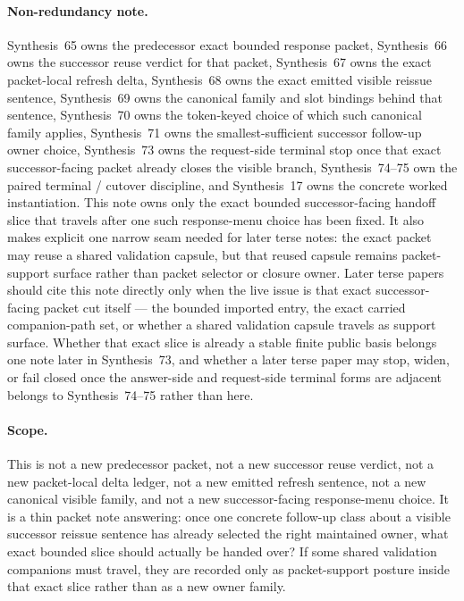 \documentclass[11pt]{article}
\begin{document}
\paragraph{Non-redundancy note.}
Synthesis~65 owns the predecessor exact bounded response packet, Synthesis~66 owns the successor reuse verdict for that packet, Synthesis~67 owns the exact packet-local refresh delta, Synthesis~68 owns the exact emitted visible reissue sentence, Synthesis~69 owns the canonical family and slot bindings behind that sentence, Synthesis~70 owns the token-keyed choice of which such canonical family applies, Synthesis~71 owns the smallest-sufficient successor follow-up owner choice, Synthesis~73 owns the request-side terminal stop once that exact successor-facing packet already closes the visible branch, Synthesis~74--75 own the paired terminal / cutover discipline, and Synthesis~17 owns the concrete worked instantiation.\cite{series:publicrequestresponsepackets,series:publicrequestresponsepacketcarryforward,series:publicrequestresponsepacketdeltas,series:publicrequestresponsepacketrefreshnotices,series:publicrequestresponsepacketrefreshnoticenormalforms,series:publicrequestresponsepacketrefreshnoticeselections,series:publicrequestresponsepacketrefreshresponsemenus,series:publicrequestresponsepacketrefreshresponsepacketclosureverdicts,series:pairedterminalcitationdiscipline,series:pairedterminalcutoverrules,series:workedexample}
This note owns only the exact bounded successor-facing handoff slice that travels after one such response-menu choice has been fixed. It also makes explicit one narrow seam needed for later terse notes: the exact packet may reuse a shared validation capsule, but that reused capsule remains packet-support surface rather than packet selector or closure owner. Later terse papers should cite this note directly only when the live issue is that exact successor-facing packet cut itself --- the bounded imported entry, the exact carried companion-path set, or whether a shared validation capsule travels as support surface. Whether that exact slice is already a stable finite public basis belongs one note later in Synthesis~73, and whether a later terse paper may stop, widen, or fail closed once the answer-side and request-side terminal forms are adjacent belongs to Synthesis~74--75 rather than here.

\paragraph{Scope.}
This is not a new predecessor packet, not a new successor reuse verdict, not a new packet-local delta ledger, not a new emitted refresh sentence, not a new canonical visible family, and not a new successor-facing response-menu choice.
It is a thin packet note answering: once one concrete follow-up class about a visible successor reissue sentence has already selected the right maintained owner, what exact bounded slice should actually be handed over? If some shared validation companions must travel, they are recorded only as packet-support posture inside that exact slice rather than as a new owner family.
\end{document}
